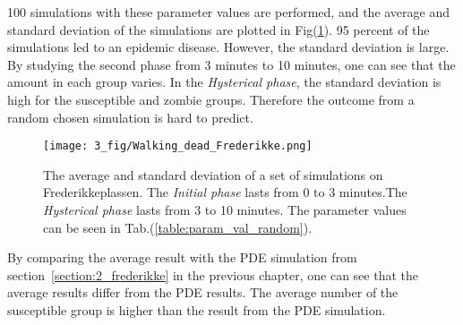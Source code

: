 \documentclass[%
twoside,                 %
final,                   %
chapterprefix=true,      %
open=right               %
10pt]{book}
\begin{document}
100 simulations with these parameter values are performed, and the average and standard deviation of the simulations are plotted in Fig(\ref{fig:walking_dead}). 95 percent of the simulations led to an epidemic disease. However, the standard deviation is large. By studying the second phase from 3 minutes to 10 minutes, one can see that the amount in each group varies. In the \emph{Hysterical phase}, the standard deviation is high for the susceptible and zombie groups. Therefore the outcome from a random chosen simulation is hard to predict.


\vspace{3mm}




\vspace{3mm}



\begin{figure}[ht]
  \centerline{\texttt{[image: 3\_fig/Walking\_dead\_Frederikke.png]}}
  \caption{
  \label{fig:walking_dead}The average and standard deviation of a set of simulations on Frederikkeplassen. The \emph{Initial phase} lasts from 0 to 3 minutes.The \emph{Hysterical phase} lasts from 3 to 10 minutes. The parameter values can be seen in Tab.(\ref{table:param_val_random}).
  }
\end{figure}


By comparing the average result with the PDE simulation from section~\ref{section:2_frederikke} in the previous chapter, one can see that the average results differ from the PDE results. The average number of the susceptible group is higher than the result from the PDE simulation. 

\label{table:frederikke_table_random}
\end{document}
